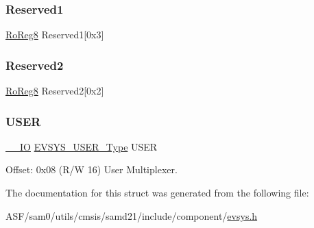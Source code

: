 \subsubsection{\texorpdfstring{Reserved1}{Reserved1}}
{\footnotesize\ttfamily \mbox{\hyperlink{group___s_a_m_d21_e15_a__definitions_ga0d957f1433aaf5d70e4dc2b68288442d}{Ro\+Reg8}} Reserved1\mbox{[}0x3\mbox{]}}

\mbox{\label{struct_evsys_a39c013121a741bab8d9442a891da19a7}} 
\subsubsection{\texorpdfstring{Reserved2}{Reserved2}}
{\footnotesize\ttfamily \mbox{\hyperlink{group___s_a_m_d21_e15_a__definitions_ga0d957f1433aaf5d70e4dc2b68288442d}{Ro\+Reg8}} Reserved2\mbox{[}0x2\mbox{]}}

\mbox{\label{struct_evsys_a27876e11f29a0ad0f8a690b9fe80773a}} 
\subsubsection{\texorpdfstring{USER}{USER}}
{\footnotesize\ttfamily \mbox{\hyperlink{core__cm0plus_8h_aec43007d9998a0a0e01faede4133d6be}{\+\_\+\+\_\+\+IO}} \mbox{\hyperlink{union_e_v_s_y_s___u_s_e_r___type}{E\+V\+S\+Y\+S\+\_\+\+U\+S\+E\+R\+\_\+\+Type}} U\+S\+ER}



Offset\+: 0x08 (R/W 16) User Multiplexer. 



The documentation for this struct was generated from the following file\+:\begin{DoxyCompactItemize}
\item 
A\+S\+F/sam0/utils/cmsis/samd21/include/component/\mbox{\hyperlink{component_2evsys_8h}{evsys.\+h}}\end{DoxyCompactItemize}
